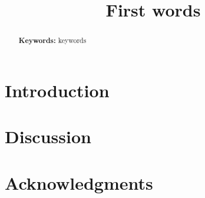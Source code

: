 \documentclass[10pt,letterpaper]{article}
\title{First words}
\begin{document}
\maketitle

\begin{abstract}


\textbf{Keywords:} 
keywords
\end{abstract}

\section{Introduction}

\section{Discussion}

\section{Acknowledgments}




\setlength{\bibleftmargin}{.125in}
\setlength{\bibindent}{-\bibleftmargin}


\end{document}
